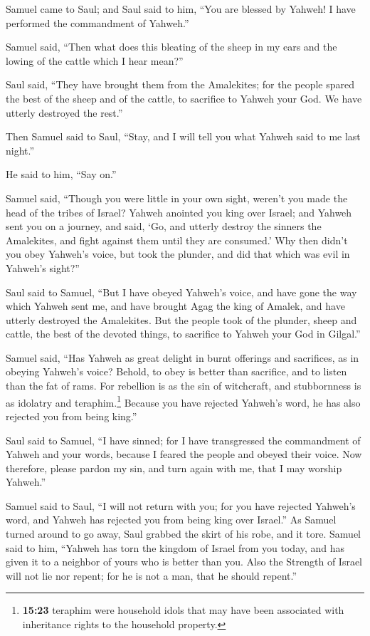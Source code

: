  Samuel came to Saul; and Saul said to him, ``You are
blessed by Yahweh! I have performed the commandment of Yahweh.''

 Samuel said, ``Then what does this bleating of the sheep
in my ears and the lowing of the cattle which I hear mean?''

 Saul said, ``They have brought them from the Amalekites;
for the people spared the best of the sheep and of the cattle, to
sacrifice to Yahweh your God. We have utterly destroyed the rest.''

 Then Samuel said to Saul, ``Stay, and I will tell you
what Yahweh said to me last night.''

He said to him, ``Say on.''

 Samuel said, ``Though you were little in your own sight,
weren't you made the head of the tribes of Israel? Yahweh anointed you
king over Israel;  and Yahweh sent you on a journey, and
said, `Go, and utterly destroy the sinners the Amalekites, and fight
against them until they are consumed.'  Why then didn't
you obey Yahweh's voice, but took the plunder, and did that which was
evil in Yahweh's sight?''

 Saul said to Samuel, ``But I have obeyed Yahweh's voice,
and have gone the way which Yahweh sent me, and have brought Agag the
king of Amalek, and have utterly destroyed the Amalekites.
 But the people took of the plunder, sheep and cattle,
the best of the devoted things, to sacrifice to Yahweh your God in
Gilgal.''

 Samuel said, ``Has Yahweh as great delight in burnt
offerings and sacrifices, as in obeying Yahweh's voice? Behold, to obey
is better than sacrifice, and to listen than the fat of rams.
 For rebellion is as the sin of witchcraft, and
stubbornness is as idolatry and teraphim.\footnote{\textbf{15:23}
  teraphim were household idols that may have been associated with
  inheritance rights to the household property.} Because you have
rejected Yahweh's word, he has also rejected you from being king.''

 Saul said to Samuel, ``I have sinned; for I have
transgressed the commandment of Yahweh and your words, because I feared
the people and obeyed their voice.  Now therefore, please
pardon my sin, and turn again with me, that I may worship Yahweh.''

 Samuel said to Saul, ``I will not return with you; for
you have rejected Yahweh's word, and Yahweh has rejected you from being
king over Israel.''  As Samuel turned around to go away,
Saul grabbed the skirt of his robe, and it tore.  Samuel
said to him, ``Yahweh has torn the kingdom of Israel from you today, and
has given it to a neighbor of yours who is better than you.
 Also the Strength of Israel will not lie nor repent; for
he is not a man, that he should repent.''

